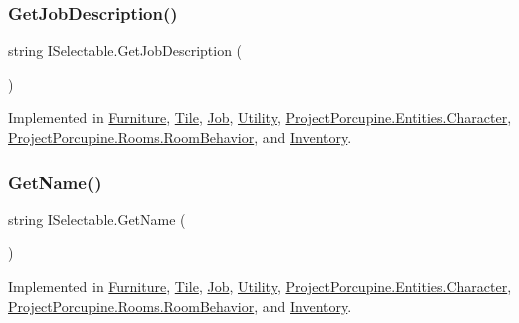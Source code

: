\mbox{\label{interface_i_selectable_a4d0f9fa51a3d70a7fbcbb39e126e4c73}} 
\subsubsection{\texorpdfstring{Get\+Job\+Description()}{GetJobDescription()}}
{\footnotesize\ttfamily string I\+Selectable.\+Get\+Job\+Description (\begin{DoxyParamCaption}{ }\end{DoxyParamCaption})}



Implemented in \hyperlink{class_furniture_aaa94fa81a9ef7c7fd7fcc5854fd1ce61}{Furniture}, \hyperlink{class_tile_a6f3f4232bc888cd335b3d0b2af6edda5}{Tile}, \hyperlink{class_job_a7161746f9a93cc8dc204a01ca01cf2fa}{Job}, \hyperlink{class_utility_a5689ffa1e6e2d4df20a92fd0a9f24309}{Utility}, \hyperlink{class_project_porcupine_1_1_entities_1_1_character_a8bdbe6c8bd400cb777f7c6e34f54c29b}{Project\+Porcupine.\+Entities.\+Character}, \hyperlink{class_project_porcupine_1_1_rooms_1_1_room_behavior_a56ddca30811b2815ccf9f3c8045ec4cc}{Project\+Porcupine.\+Rooms.\+Room\+Behavior}, and \hyperlink{class_inventory_a4781e2a97ef39ee9e137d64c819c7f8a}{Inventory}.

\mbox{\label{interface_i_selectable_af676ba50e2cd5839438d3092743a79da}} 
\subsubsection{\texorpdfstring{Get\+Name()}{GetName()}}
{\footnotesize\ttfamily string I\+Selectable.\+Get\+Name (\begin{DoxyParamCaption}{ }\end{DoxyParamCaption})}



Implemented in \hyperlink{class_furniture_a4cca1807f72cdf61fe438976db5ecf9c}{Furniture}, \hyperlink{class_tile_a6a552b263f6505a56a4d81f9ed835e84}{Tile}, \hyperlink{class_job_a250a84373e09871c23aab690829e91af}{Job}, \hyperlink{class_utility_a3c5c2a1968dfcf083e9b1fa9b843184d}{Utility}, \hyperlink{class_project_porcupine_1_1_entities_1_1_character_abe834c84bb93ab0518c92452a33d18e5}{Project\+Porcupine.\+Entities.\+Character}, \hyperlink{class_project_porcupine_1_1_rooms_1_1_room_behavior_a1b6f920757fd3485cb0bc59b1101c0fb}{Project\+Porcupine.\+Rooms.\+Room\+Behavior}, and \hyperlink{class_inventory_a627326dce64285113303015d25a80fd0}{Inventory}.




